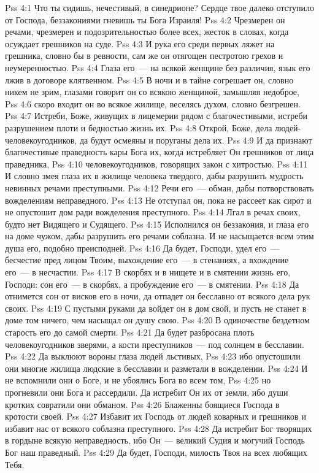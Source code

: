\vs Pss 4:1
Что ты сидишь, нечестивый, в синедрионе? Сердце твое далеко
отступило от Господа, беззакониями гневишь ты Бога Израиля!
\vs Pss 4:2
Чрезмерен он речами, чрезмерен и подозрительностью более всех,
жесток в словах, когда осуждает грешников на суде.
\vs Pss 4:3
И рука его среди первых ляжет на грешника, словно бы в
ревности, сам же он отягощен пестротою грехов и неумеренностью.
\vs Pss 4:4
Глаза его~--- на всякой женщине без различия, язык его лжив
в договоре клятвенном.
\vs Pss 4:5
В ночи и в тайне согрешает он, словно никем не зрим, глазами
говорит он со всякою женщиной, замышляя недоброе,
\vs Pss 4:6
скоро входит он во всякое жилище, веселясь духом, словно
безгрешен.
\vs Pss 4:7
Истреби, Боже, живущих в лицемерии рядом с благочестивыми,
истреби разрушением плоти и бедностью жизнь их.
\vs Pss 4:8
Открой, Боже, дела людей-человекоугодников, да будут осмеяны и
поруганы дела их.
\vs Pss 4:9
И да признают благочестивые праведность кары Бога их, когда
истребляет Он грешников от лица праведника,
\vs Pss 4:10
человекоугодников, говорящих закон с хитростью.
\vs Pss 4:11
И словно змея глаза их в жилище человека твердого, дабы разрушить
мудрость невинных речами преступными.
\vs Pss 4:12
Речи его~--- обман, дабы потворствовать вожделениям
неправедного.
\vs Pss 4:13
Не отступал он, пока не рассеет как сирот и не опустошит дом ради
вожделения преступного.
\vs Pss 4:14
Лгал в речах своих, будто нет Видящего и Судящего.
\vs Pss 4:15
Исполнился он беззакония, и глаза его на доме чужом, дабы разрушить
его речами
соблазна. И не насыщается всем этим душа его, подобно преисподней.
\vs Pss 4:16
Да будет, Господи, удел его~--- бесчестие пред лицом Твоим,
выхождение его~--- в стенаниях, а вхождение его~--- в несчастии.
\vs Pss 4:17
В скорбях и в нищете и в смятении жизнь его, Господи: сон его~--- в
скорбях, а пробуждение его~--- в смятении.
\vs Pss 4:18
Да отнимется сон от висков его в ночи, да отпадет он бесславно от
всякого дела рук своих.
\vs Pss 4:19
С пустыми руками да войдет он в дом свой, и пусть не станет в доме
том ничего, чем насыщал он душу свою.
\vs Pss 4:20
В одиночестве бездетном старость его до самой смерти.
\vs Pss 4:21
Да будет разбросана плоть человекоугодников зверями, а кости
преступников~--- под солнцем в бесславии.
\vs Pss 4:22
Да выклюют вороны глаза людей льстивых,
\vs Pss 4:23
ибо опустошили они многие жилища людские в бесславии и разметали в
вожделении.
\vs Pss 4:24
И не вспомнили они о Боге, и не убоялись Бога во всем том,
\vs Pss 4:25
но прогневили они Бога и рассердили. Да истребит Он их от земли, ибо
души кротких совратили они обманом.
\vs Pss 4:26
Блаженны боящиеся Господа в кротости своей.
\vs Pss 4:27
Избавит их Господь от людей коварных и грешников и избавит нас от
всякого соблазна преступного.
\vs Pss 4:28
Да истребит Бог творящих в гордыне всякую неправедность, ибо
Он~--- великий Судия и могучий Господь Бог наш праведный.
\vs Pss 4:29
Да будет, Господи, милость Твоя на всех любящих Тебя.

